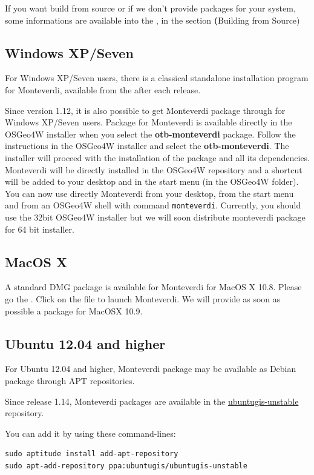 If you want build from source or if we don't provide packages for your system, some informations are available into the \sg, in the section \textbf(Building from Source)

\subsection{Windows XP/Seven}
For Windows XP/Seven users, there is a classical standalone installation program for Monteverdi, available from the \download after each release. 

Since version 1.12, it is also possible to get Monteverdi package through \osgeow for Windows XP/Seven users. Package for Monteverdi is available directly in the OSGeo4W installer when you select the \textbf{otb-monteverdi} package. Follow the instructions in the OSGeo4W installer and select the \textbf{otb-monteverdi}. The installer will proceed with the installation of the package and all its dependencies. Monteverdi will be directly installed in the OSGeo4W repository and a shortcut will be added to your desktop and in the start menu (in the OSGeo4W folder). You can now use directly Monteverdi from your desktop, from the start menu and from an OSGeo4W shell with command \texttt{monteverdi}. Currently, you should use the 32bit OSGeo4W installer but we will soon distribute monteverdi package for 64 bit installer. 

\subsection{MacOS X}
A standard DMG package is available for Monteverdi for MacOS X 10.8. Please go the \download.
Click on the file to launch Monteverdi. We will provide as soon as possible a package for MacOSX 10.9.

\subsection{Ubuntu 12.04 and higher}
For Ubuntu 12.04 and higher, Monteverdi package may be available as Debian package through APT repositories.

Since release 1.14, Monteverdi packages are available in the
\href{https://launchpad.net/~ubuntugis/+archive/ubuntugis-unstable}{ubuntugis-unstable} repository.

You can add it by using these command-lines:
\begin{verbatim}
sudo aptitude install add-apt-repository
sudo apt-add-repository ppa:ubuntugis/ubuntugis-unstable
\end{verbatim}


